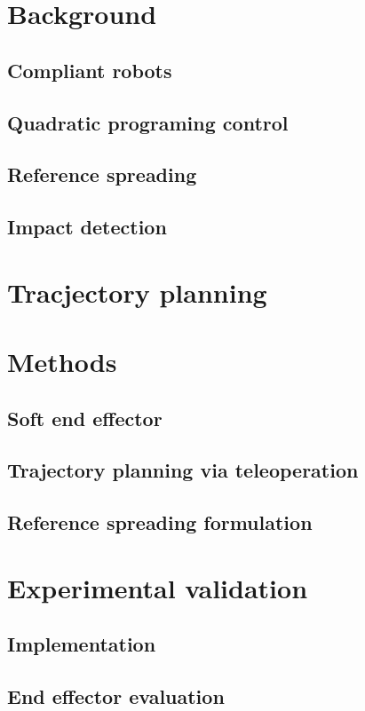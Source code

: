 \documentclass[a4paper, 10pt, conference]{ieeeconf}
\begin{document}
    \section{Background}
    \subsection{Compliant robots}
    \subsection{Quadratic programing control}
    \subsection{Reference spreading}
    \subsection{Impact detection}
    \section{Tracjectory planning}

    \section{Methods}
    \subsection{Soft end effector}
    \subsection{Trajectory planning via teleoperation}
    \subsection{Reference spreading formulation}

    \section{Experimental validation}
    \subsection{Implementation}
    \subsection{End effector evaluation}
\end{document}

